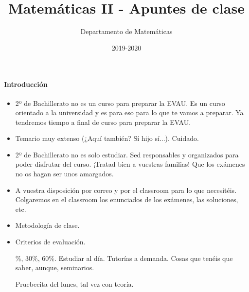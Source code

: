 \documentclass[nobuilddate,nochap]{Docencia}
\title{Matemáticas II - Apuntes de clase}
\author{Departamento de Matemáticas}
\date{2019-2020}
\begin{document}
\pagestyle{plain}
\maketitle
\tableofcontents
\newpage

\newcommand{\hide}[1]{#1}

\renewcommand{\vec}[1]{\overrightarrow{#1}}

\paragraph{Introducción}

\begin{itemize}
    \item 2º de Bachillerato no es un curso para preparar la EVAU. Es un curso orientado a la universidad y es para eso para lo que te vamos a preparar. 
    Ya tendremos tiempo a final de curso para preparar la EVAU.

    \item Temario muy extenso (¿Aquí también? Sí hijo sí...). Cuidado.
    
    \item 2º de Bachillerato no es solo estudiar. Sed responsables y organizados para poder disfrutar del curso. ¡Tratad bien a vuestras familias! Que los exámenes no os hagan ser unos amargados.
    
    \item A vuestra disposición por correo y por el classroom para lo que necesitéis. Colgaremos en el classroom los enunciados de los exámenes, las soluciones, etc.

    \item Metodología de clase.
    
    \item Criterios de evaluación.

    \%, 30\%, 60\%. Estudiar al día. Tutorías a demanda. Cosas que tenéis que saber, aunque, seminarios.

    \subitem Pruebecita del lunes, tal vez con teoría.

\end{itemize}

%
%
%
%

%

\newpage
\printindex
\listoffigures
\listoftables
\end{document}
